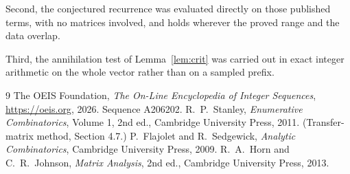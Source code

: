 \documentclass[11pt,a4paper]{article}
\theoremstyle{plain}
\theoremstyle{definition}
\begin{document}
Second, the conjectured recurrence was evaluated directly on those published terms, with no
matrices involved, and holds wherever the proved range and the data overlap.

Third, the annihilation test of Lemma~\ref{lem:crit} was carried out in exact integer
arithmetic on the whole vector rather than on a sampled prefix.

\begin{thebibliography}{9}
 The OEIS Foundation, \emph{The On-Line Encyclopedia of Integer
Sequences}, \url{https://oeis.org}, 2026. Sequence A206202.
 R.~P.~Stanley, \emph{Enumerative Combinatorics}, Volume 1, 2nd ed.,
Cambridge University Press, 2011. (Transfer-matrix method, Section 4.7.)
 P.~Flajolet and R.~Sedgewick, \emph{Analytic Combinatorics}, Cambridge
University Press, 2009.
 R.~A.~Horn and C.~R.~Johnson, \emph{Matrix Analysis}, 2nd ed., Cambridge
University Press, 2013.
\end{thebibliography}
\end{document}
